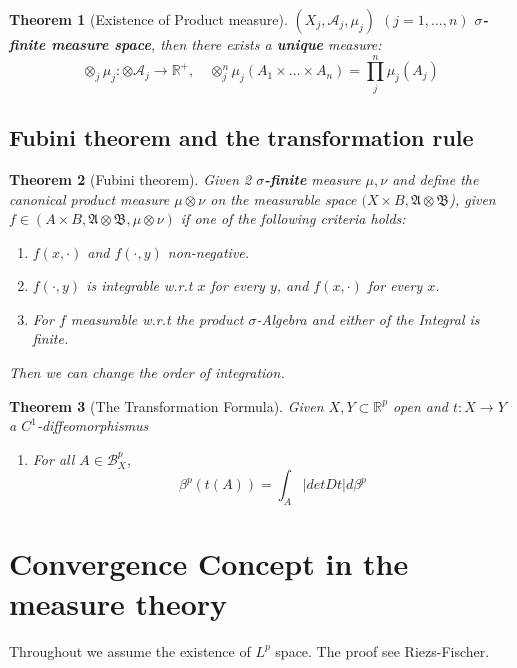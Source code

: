 \documentclass[a4paper,11pt,oneside,fleqn]{book}
\newtheorem{theorem}{Theorem}[section]
\theoremstyle{definition}
\theoremstyle{remark}
\begin{document}
\begin{theorem}[Existence of Product measure]
$(X_j, \mathcal{A}_j, \mu_j)$ $(j = 1, \dots, n)$ \textbf{$\sigma$-finite measure space}, then there exists a \textbf{unique} measure:
\begin{equation*}
	\otimes_j \mu_j : \otimes \mathcal{A}_j \rightarrow \mathbb{R}^+, 
	\quad \otimes_j^n \mu_j(A_1 \times \dots \times A_n) = \prod_j^n \mu_j(A_j)
\end{equation*}
\end{theorem}


\subsection{Fubini theorem and the transformation rule}


\begin{theorem}[Fubini theorem]
	Given 2 \textbf{$\sigma$-finite} measure $\mu, \nu$ and define the canonical product measure $\mu \otimes \nu$ on the measurable space $(X \times B, \mathfrak{A} \otimes \mathfrak{B}$), given $f \in (A \times B, \mathfrak{A} \otimes \mathfrak{B}, \mu \otimes \nu)$ if one of the following criteria holds:
	\begin{enumerate}
		\item $f(x, \cdot)$ and $f(\cdot, y)$ non-negative.
		\item $f(\cdot, y)$ is integrable w.r.t $x$ for every $y$, and $f(x, \cdot)$ for every $x$.
		\item For $f$ measurable w.r.t the product $\sigma$-Algebra and either of the Integral is finite.
	\end{enumerate}
	Then we can change the order of integration.
\end{theorem}

\begin{theorem}[The Transformation Formula]
	Given $X, Y \subset \mathbb{R}^p$ open and $t: X \rightarrow Y$ a $C^1$-diffeomorphismus 
	\begin{enumerate}
		\item For all $A \in \mathcal{B}^p_X$, 
			\begin{equation*}
				\beta^p(t(A)) = \int_A |det Dt| d\beta^p
			\end{equation*}
	\end{enumerate}
\end{theorem}



\newpage
\section{Convergence Concept in the measure theory}
Throughout we assume the existence of $L^p$ space. The proof see Riezs-Fischer.
\end{document}
